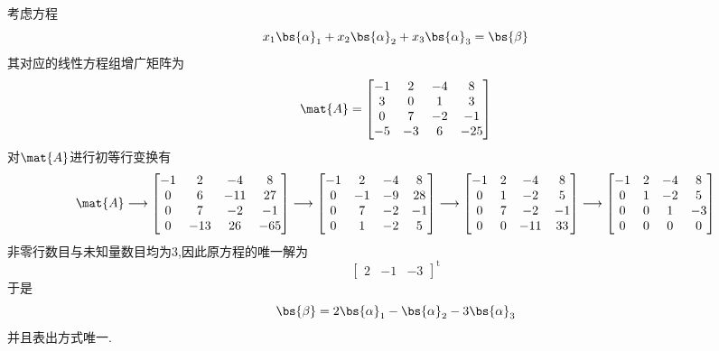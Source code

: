 \documentclass{ctexart}
\begin{document}
\begin{solution}
    考虑方程
    \[x_1\bs{\alpha}_1+x_2\bs{\alpha}_2+x_3\bs{\alpha}_3=\bs{\beta}\]
    其对应的线性方程组增广矩阵为
    \[\mat{A}=\begin{bmatrix}
        -1 & 2 & -4 & 8\\
        3 & 0 & 1 & 3\\
        0 & 7 & -2 & -1\\
        -5 & -3 & 6 & -25
    \end{bmatrix}\]
    对$\mat{A}$进行初等行变换有
    \[\mat{A}\longrightarrow\begin{bmatrix}
        -1&2&-4&8\\
        0&6&-11&27\\
        0&7&-2&-1\\
        0&-13&26&-65
    \end{bmatrix}\longrightarrow\begin{bmatrix}
        -1&2&-4&8\\
        0&-1&-9&28\\
        0&7&-2&-1\\
        0&1&-2&5
    \end{bmatrix}\longrightarrow\begin{bmatrix}
        -1&2&-4&8\\
        0&1&-2&5\\
        0&7&-2&-1\\
        0&0&-11&33
    \end{bmatrix}\longrightarrow\begin{bmatrix}
        -1&2&-4&8\\
        0&1&-2&5\\
        0&0&1&-3\\
        0&0&0&0
    \end{bmatrix}\]
    非零行数目与未知量数目均为$3$,因此原方程的唯一解为
    \[\begin{bmatrix}
        2&-1&-3
    \end{bmatrix}^{\text{t}}\]
    于是
    \[\bs{\beta}=2\bs{\alpha}_1-\bs{\alpha}_2-3\bs{\alpha}_3\]
    并且表出方式唯一.
\end{solution}
\end{document}
